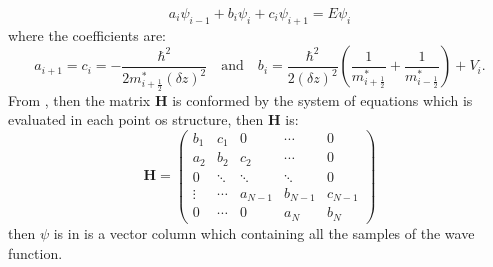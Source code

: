 \begin{equation}\label{eqn:chapter-2-sec-numerical-calculations-schrodinger-discrete-to-matrix}
	a_{i}\psi_{i-1}+b_{i}\psi_{i}+c_{i}\psi_{i+1}=E\psi_{i}
\end{equation}
where the coefficients are:
\begin{equation}\label{eqn:chapter-2-sec-numerical-calculations-schrodinger-discrete-to-matrix-coefficients}
	a_{i+1}=c_{i}= -\dfrac{\hbar^2}{2m^{*}_{i+\frac{1}{2}}(\delta z)^2} \quad \text{and}\quad b_{i}=\dfrac{\hbar^{2}}{2(\delta z)^2}\left(\dfrac{1}{m^{*}_{i+\frac{1}{2}}}+\dfrac{1}{m^{*}_{i-\frac{1}{2}}}\right)+V_{i}.
\end{equation}
From , then the matrix \textbf{H} is conformed by the system of equations which is evaluated in each point os structure, then \textbf{H} is:  
\begin{equation}
	\textbf{H}=\begin{pmatrix}
		b_{1} & c_{1} & 0      &\cdots & 0\\
		a_{2} & b_{2} & c_{2}  &\cdots &0\\
		0     &\ddots &\ddots  &\ddots&0\\
		\vdots&\cdots &a_{N-1} &b_{N-1}&c_{N-1}\\
		0     &\cdots&0        &a_{N}  &b_{N} 
	\end{pmatrix}
\end{equation}
then $\psi$ is in  is a vector column which containing all the samples of the wave function. 

